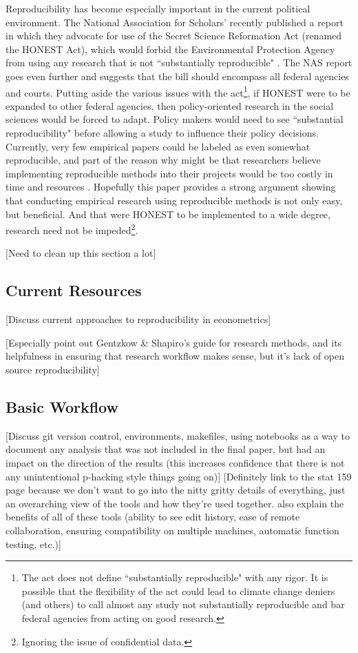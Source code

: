\documentclass[12pt]{article}
\begin{document}
Reproducibility has become especially important in the current political environment. The National Association for Scholars' recently published a report in which they advocate for use of the Secret Science Reformation Act (renamed the HONEST Act), which would forbid the Environmental Protection Agency from using any research that is not ``substantially reproducible" \cite{wired}. The NAS report goes even further and suggests that the bill should encompass all federal agencies and courts. Putting aside the various issues with the act\footnote{The act does not define ``substantially reproducible" with any rigor. It is possible that the flexibility of the act could lead to climate change deniers (and others) to call almost any study not substantially reproducible and bar federal agencies from acting on good research.}, if HONEST were to be expanded to other federal agencies, then policy-oriented research in the social sciences would be forced to adapt. Policy makers would need to see ``substantial reproducibility" before allowing a study to influence their policy decisions. Currently, very few empirical papers could be labeled as even somewhat reproducible, and part of the reason why might be that researchers believe implementing reproducible methods into their projects would be too costly in time and resources \cite{irreproducible}. Hopefully this paper provides a strong argument showing that conducting empirical research using reproducible methods is not only easy, but beneficial. And that were HONEST to be implemented to a wide degree, research need not be impeded\footnote{Ignoring the issue of confidential data.}.


\textcolor{BrickRed}{[Need to clean up this section a lot]}

\subsection{Current Resources}
\textcolor{BrickRed}{[Discuss current approaches to reproducibility in econometrics]}

\textcolor{BrickRed}{[Especially point out Gentzkow \& Shapiro's guide for research methods, and its helpfulness in ensuring that research workflow makes sense, but it's lack of open source reproducibility]}

\subsection{Basic Workflow}
\textcolor{BrickRed}{[Discuss git version control, environments, makefiles, using notebooks as a way to document any analysis that was not included in the final paper, but had an impact on the direction of the results (this increases confidence that there is not any unintentional p-hacking style things going on)]}
\textcolor{BrickRed}{[Definitely link to the stat 159 page because we don't want to go into the nitty gritty details of everything, just an overarching view of the tools and how they're used together. also explain the benefits of all of these tools (ability to see edit history, ease of remote collaboration, ensuring compatibility on multiple machines, automatic function testing, etc.)]}
\end{document}
